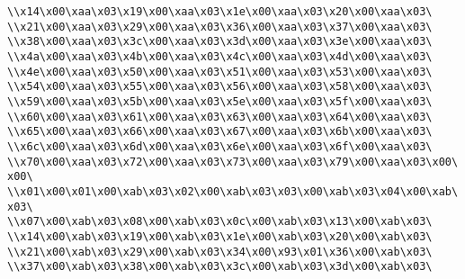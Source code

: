 \verb|\\x14\x00\xaa\x03\x19\x00\xaa\x03\x1e\x00\xaa\x03\x20\x00\xaa\x03\|\newline
\verb|\\x21\x00\xaa\x03\x29\x00\xaa\x03\x36\x00\xaa\x03\x37\x00\xaa\x03\|\newline
\verb|\\x38\x00\xaa\x03\x3c\x00\xaa\x03\x3d\x00\xaa\x03\x3e\x00\xaa\x03\|\newline
\verb|\\x4a\x00\xaa\x03\x4b\x00\xaa\x03\x4c\x00\xaa\x03\x4d\x00\xaa\x03\|\newline
\verb|\\x4e\x00\xaa\x03\x50\x00\xaa\x03\x51\x00\xaa\x03\x53\x00\xaa\x03\|\newline
\verb|\\x54\x00\xaa\x03\x55\x00\xaa\x03\x56\x00\xaa\x03\x58\x00\xaa\x03\|\newline
\verb|\\x59\x00\xaa\x03\x5b\x00\xaa\x03\x5e\x00\xaa\x03\x5f\x00\xaa\x03\|\newline
\verb|\\x60\x00\xaa\x03\x61\x00\xaa\x03\x63\x00\xaa\x03\x64\x00\xaa\x03\|\newline
\verb|\\x65\x00\xaa\x03\x66\x00\xaa\x03\x67\x00\xaa\x03\x6b\x00\xaa\x03\|\newline
\verb|\\x6c\x00\xaa\x03\x6d\x00\xaa\x03\x6e\x00\xaa\x03\x6f\x00\xaa\x03\|\newline
\verb|\\x70\x00\xaa\x03\x72\x00\xaa\x03\x73\x00\xaa\x03\x79\x00\xaa\x03\x00\x00\|\newline
\verb|\\x01\x00\x01\x00\xab\x03\x02\x00\xab\x03\x03\x00\xab\x03\x04\x00\xab\x03\|\newline
\verb|\\x07\x00\xab\x03\x08\x00\xab\x03\x0c\x00\xab\x03\x13\x00\xab\x03\|\newline
\verb|\\x14\x00\xab\x03\x19\x00\xab\x03\x1e\x00\xab\x03\x20\x00\xab\x03\|\newline
\verb|\\x21\x00\xab\x03\x29\x00\xab\x03\x34\x00\x93\x01\x36\x00\xab\x03\|\newline
\verb|\\x37\x00\xab\x03\x38\x00\xab\x03\x3c\x00\xab\x03\x3d\x00\xab\x03\|\newline
